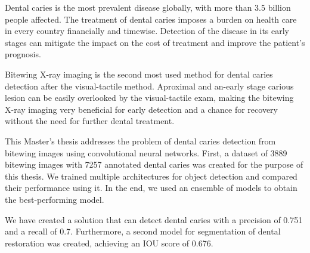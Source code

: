 
\ctuprocess

\begin{abstract-english}
Dental caries is the most prevalent disease globally, with more than 3.5 billion people affected. The treatment of dental caries imposes a burden on health care in every country financially and timewise. Detection of the disease in its early stages can mitigate the impact on the cost of treatment and improve the patient's prognosis.

Bitewing X-ray imaging is the second most used method for dental caries detection after the visual-tactile method. Aproximal and an-early stage carious lesion can be easily overlooked by the visual-tactile exam, making the bitewing X-ray imaging very beneficial for early detection and a chance for recovery without the need for further dental treatment.

This Master's thesis addresses the problem of dental caries detection from bitewing images using convolutional neural networks. First, a dataset of 3889 bitewing images with 7257 annotated dental caries was created for the purpose of this thesis. We trained multiple architectures for object detection and compared their performance using it. In the end, we used an ensemble of models to obtain the best-performing model.


We have created a solution that can detect dental caries with a precision of 0.751 and a recall of 0.7. Furthermore, a second model for segmentation of dental restoration was created, achieving an IOU score of 0.676.
\end{abstract-english}

